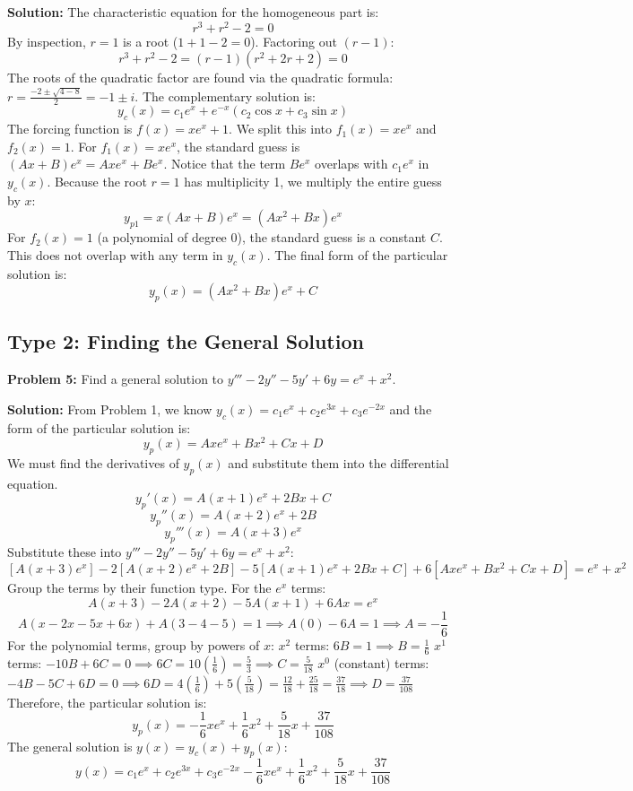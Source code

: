 \documentclass[11pt]{article}
\begin{document}
\textbf{Solution:}
The characteristic equation for the homogeneous part is:
\[ r^3 + r^2 - 2 = 0 \]
By inspection, $r = 1$ is a root ($1 + 1 - 2 = 0$). Factoring out $(r - 1)$:
\[ r^3 + r^2 - 2 = (r - 1)(r^2 + 2r + 2) = 0 \]
The roots of the quadratic factor are found via the quadratic formula: $r = \frac{-2 \pm \sqrt{4 - 8}}{2} = -1 \pm i$.
The complementary solution is:
\[ y_c(x) = c_1 e^x + e^{-x}(c_2 \cos x + c_3 \sin x) \]
The forcing function is $f(x) = x e^x + 1$. We split this into $f_1(x) = x e^x$ and $f_2(x) = 1$.
For $f_1(x) = x e^x$, the standard guess is $(A x + B)e^x = A x e^x + B e^x$. Notice that the term $B e^x$ overlaps with $c_1 e^x$ in $y_c(x)$. Because the root $r=1$ has multiplicity 1, we multiply the entire guess by $x$:
\[ y_{p1} = x(A x + B)e^x = (A x^2 + B x)e^x \]
For $f_2(x) = 1$ (a polynomial of degree 0), the standard guess is a constant $C$. This does not overlap with any term in $y_c(x)$.
The final form of the particular solution is:
\[ y_p(x) = (A x^2 + B x)e^x + C \]

\subsection{Type 2: Finding the General Solution}

\textbf{Problem 5:} Find a general solution to $y''' - 2y'' - 5y' + 6y = e^x + x^2$.

\textbf{Solution:}
From Problem 1, we know $y_c(x) = c_1 e^x + c_2 e^{3x} + c_3 e^{-2x}$ and the form of the particular solution is:
\[ y_p(x) = A x e^x + B x^2 + C x + D \]
We must find the derivatives of $y_p(x)$ and substitute them into the differential equation.
\[ y_p'(x) = A(x + 1)e^x + 2Bx + C \]
\[ y_p''(x) = A(x + 2)e^x + 2B \]
\[ y_p'''(x) = A(x + 3)e^x \]
Substitute these into $y''' - 2y'' - 5y' + 6y = e^x + x^2$:
\[ [A(x + 3)e^x] - 2[A(x + 2)e^x + 2B] - 5[A(x + 1)e^x + 2Bx + C] + 6[A x e^x + B x^2 + C x + D] = e^x + x^2 \]
Group the terms by their function type.
For the $e^x$ terms:
\[ A(x + 3) - 2A(x + 2) - 5A(x + 1) + 6Ax = e^x \]
\[ A(x - 2x - 5x + 6x) + A(3 - 4 - 5) = 1 \implies A(0) - 6A = 1 \implies A = -\frac{1}{6} \]
For the polynomial terms, group by powers of $x$:
$x^2$ terms: $6B = 1 \implies B = \frac{1}{6}$
$x^1$ terms: $-10B + 6C = 0 \implies 6C = 10(\frac{1}{6}) = \frac{5}{3} \implies C = \frac{5}{18}$
$x^0$ (constant) terms: $-4B - 5C + 6D = 0 \implies 6D = 4(\frac{1}{6}) + 5(\frac{5}{18}) = \frac{12}{18} + \frac{25}{18} = \frac{37}{18} \implies D = \frac{37}{108}$
Therefore, the particular solution is:
\[ y_p(x) = -\frac{1}{6} x e^x + \frac{1}{6} x^2 + \frac{5}{18} x + \frac{37}{108} \]
The general solution is $y(x) = y_c(x) + y_p(x)$:
\[ y(x) = c_1 e^x + c_2 e^{3x} + c_3 e^{-2x} - \frac{1}{6} x e^x + \frac{1}{6} x^2 + \frac{5}{18} x + \frac{37}{108} \]
\end{document}
